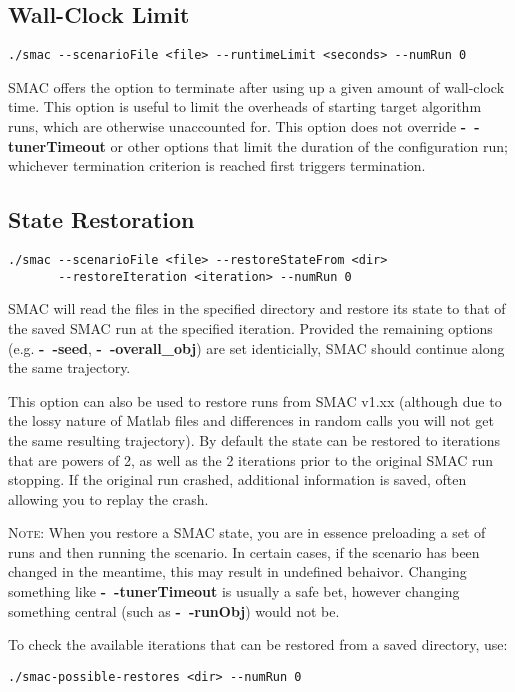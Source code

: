 \subsection{Wall-Clock Limit}\label{sec:wall-clock}
\begin{verbatim}
./smac --scenarioFile <file> --runtimeLimit <seconds> --numRun 0
\end{verbatim}
SMAC offers the option to terminate after using up a given amount of wall-clock time. This option is useful to limit the overheads of starting target algorithm runs, which are otherwise unaccounted for.
This option does not override \textbf{-~$\!$-tunerTimeout} or other options that limit the duration of the configuration run; whichever termination criterion is reached first triggers termination. 

\subsection{State Restoration}\label{sec:state-restoration}
\begin{verbatim}
./smac --scenarioFile <file> --restoreStateFrom <dir> 
       --restoreIteration <iteration> --numRun 0
\end{verbatim}
SMAC will read the files in the specified directory and restore 
its state to that of the saved SMAC run at the specified iteration.
Provided the remaining options (e.g. \textbf{-~$\!$-seed}, \textbf{-~$\!$-overall\_obj}) are set identicially, SMAC should continue along the same trajectory.

This option can also be used to restore runs from SMAC v1.xx (although due to the lossy nature of Matlab files and differences in random calls you will not get the same resulting trajectory). By default the state can be restored to iterations that are powers of 2, as well as the 2 iterations prior to the original SMAC run stopping. 
If the original run crashed, additional information is saved, often allowing you to replay the crash.

\textsc{Note:} When you restore a SMAC state, you are in essence preloading a set of runs and then running the scenario. In certain cases, if the scenario has been changed in the meantime, this may result in undefined behaivor. Changing something like \textbf{-~$\!$-tunerTimeout} is usually a safe bet, however changing something central (such as \textbf{-~$\!$-runObj}) would not be.

To check the available iterations that can be restored from a saved
directory, use:
\begin{verbatim}
./smac-possible-restores <dir> --numRun 0
\end{verbatim}

